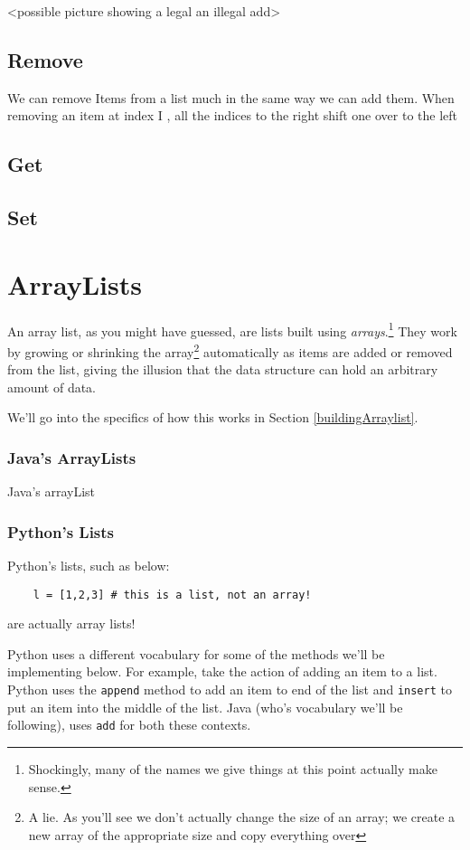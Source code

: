 <possible picture showing a legal an illegal add>


\subsection{Remove}  We can remove Items from a list much in the same way we can add them. When removing an item at index I , all the indices to the right shift one over to the left 
\subsection{Get}
\subsection{Set}

\section{ArrayLists}
An array list, as you might have guessed, are lists built using \textit{arrays}.\footnote{Shockingly, many of the names we give things at this point actually make sense.}
They work by growing or shrinking the array\footnote{A lie.  As you'll see we don't actually change the size of an array;  we create a new array of the appropriate size and copy everything over} automatically as items are added or removed from the list, giving the illusion that the data structure can hold an arbitrary amount of data.

We'll go into the specifics of how this works in Section \ref{buildingArraylist}.


\subsubsection{Java's ArrayLists}
Java's arrayList
\subsubsection{Python's Lists}
Python's lists, such as below:
\begin{verbatim}
	l = [1,2,3] # this is a list, not an array!	
\end{verbatim}
are actually array lists! %

Python uses a different vocabulary for some of the methods we'll be implementing below.  
For example, take the action of adding an item to a list.
Python uses the \texttt{append} method to add an item to end of the list and \texttt{insert} to put an item into the middle of the list.
Java (who's vocabulary we'll be following), uses \texttt{add} for both these contexts. 









